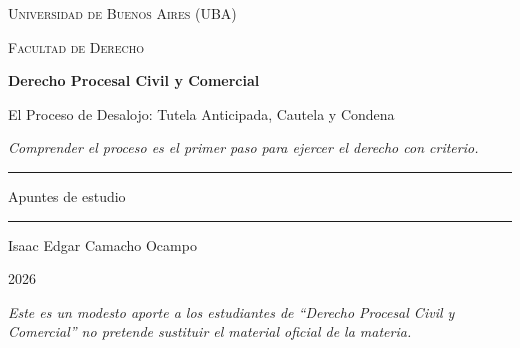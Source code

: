\documentclass[12pt,oneside]{book}
\newcommand{\universidad}{Universidad de Buenos Aires (UBA)}
\newcommand{\facultad}{Facultad de Derecho}
\newcommand{\materia}{Derecho Procesal Civil y Comercial}
\newcommand{\titulo}{El Proceso de Desalojo: Tutela Anticipada, Cautela y Condena}
\newcommand{\autor}{Isaac Edgar Camacho Ocampo}
\newcommand{\anio}{2026}
\begin{document}
\begin{titlepage}
\thispagestyle{empty}

\begin{center}

\vspace*{1cm}

{\large \textsc{\universidad}}

\vspace{0.2cm}

{\large \textsc{\facultad}}

\vspace{3cm}

{\Huge \textbf{\materia}}

\vspace{1cm}

{\LARGE \titulo}

\vspace{0.8cm}

\textit{Comprender el proceso es el primer paso para ejercer el derecho con criterio.}

\vspace{1.2cm}

\rule{0.70\textwidth}{0.5pt}

\vspace{0.5cm}

{\large Apuntes de estudio}

\vspace{0.5cm}

\rule{0.70\textwidth}{0.5pt}

\vfill

{\large \autor}

\vspace{0.3cm}

{\large \anio}

\end{center}

\vfill

\begin{flushleft}
\textit{Este es un modesto aporte a los estudiantes de ``Derecho Procesal Civil y Comercial'' no pretende sustituir el material oficial de la materia.}
\end{flushleft}

\end{titlepage}

\tableofcontents
\clearpage
\end{document}
